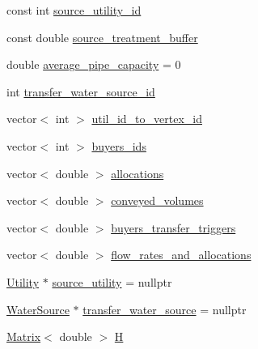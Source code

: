 \begin{DoxyCompactItemize}
\item 
const int \mbox{\hyperlink{classTransfers_a4513cfef08bd7e9980d098f8fb7d6a32_a4513cfef08bd7e9980d098f8fb7d6a32}{source\+\_\+utility\+\_\+id}}
\item 
const double \mbox{\hyperlink{classTransfers_a69a7ec8b065b9c807e2256f205a3d41e_a69a7ec8b065b9c807e2256f205a3d41e}{source\+\_\+treatment\+\_\+buffer}}
\item 
double \mbox{\hyperlink{classTransfers_a7715c87efbee763488d6fcc4674f2523_a7715c87efbee763488d6fcc4674f2523}{average\+\_\+pipe\+\_\+capacity}} = 0
\item 
int \mbox{\hyperlink{classTransfers_a039a24fe986a718da1ac61bac0e49644_a039a24fe986a718da1ac61bac0e49644}{transfer\+\_\+water\+\_\+source\+\_\+id}}
\item 
vector$<$ int $>$ \mbox{\hyperlink{classTransfers_a420b61c6ff119fef48a39a39ae4e0958_a420b61c6ff119fef48a39a39ae4e0958}{util\+\_\+id\+\_\+to\+\_\+vertex\+\_\+id}}
\item 
vector$<$ int $>$ \mbox{\hyperlink{classTransfers_a55506f9588e0132ffcad1cf0036a83af_a55506f9588e0132ffcad1cf0036a83af}{buyers\+\_\+ids}}
\item 
vector$<$ double $>$ \mbox{\hyperlink{classTransfers_ad956149e16363b5a04fd0a4f6efb3a61_ad956149e16363b5a04fd0a4f6efb3a61}{allocations}}
\item 
vector$<$ double $>$ \mbox{\hyperlink{classTransfers_a2989642c0fe0544dd9345d45042933d5_a2989642c0fe0544dd9345d45042933d5}{conveyed\+\_\+volumes}}
\item 
vector$<$ double $>$ \mbox{\hyperlink{classTransfers_a6eab429701a7e1dc857675cc8571589c_a6eab429701a7e1dc857675cc8571589c}{buyers\+\_\+transfer\+\_\+triggers}}
\item 
vector$<$ double $>$ \mbox{\hyperlink{classTransfers_af4ef4c75d49dfb3aee476c0695ff41d5_af4ef4c75d49dfb3aee476c0695ff41d5}{flow\+\_\+rates\+\_\+and\+\_\+allocations}}
\item 
\mbox{\hyperlink{classUtility}{Utility}} $\ast$ \mbox{\hyperlink{classTransfers_a8c84c081f069f6835e9dd12a460d90eb_a8c84c081f069f6835e9dd12a460d90eb}{source\+\_\+utility}} = nullptr
\item 
\mbox{\hyperlink{classWaterSource}{Water\+Source}} $\ast$ \mbox{\hyperlink{classTransfers_a6a23dc463d7a4b07bcb7f3a7472263b2_a6a23dc463d7a4b07bcb7f3a7472263b2}{transfer\+\_\+water\+\_\+source}} = nullptr
\item 
\mbox{\hyperlink{classMatrix}{Matrix}}$<$ double $>$ \mbox{\hyperlink{classTransfers_aec57a6a75061f18404e30d8e48c45ffd_aec57a6a75061f18404e30d8e48c45ffd}{H}}

\end{DoxyCompactItemize}
